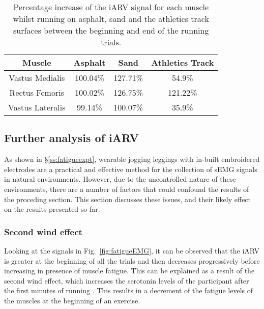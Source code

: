 \documentclass[letterpaper, 10 pt, conference]{ieeeconf}
\newcommand{\fref}[1]{Fig.~\ref{#1}}       \newcommand{\sref}[1]{\S\ref{#1}}          \newcommand{\tref}[1]{\tablename~\ref{#1}} \newcommand{\eref}[1]{(\ref{#1})}
\begin{document}
\begin{table}[t!]
\centering
\label{my-label}
\begin{tabular}{cccc}
\hline
Muscle           & Asphalt  & Sand     & Athletics Track \\\hline
Vastus Medialis  & 100.04\% & 127.71\% & 54.9\%          \\
Rectus Femoris   & 100.02\% & 126.75\% & 121.22\%        \\
Vastus Lateralis & 99.14\%  & 100.07\% & 35.9\%         
\end{tabular}
\caption{Percentage increase of the iARV signal for each muscle whilst running on asphalt, sand and the athletics track surfaces between the beginning and end of the running trials.}
\end{table}

\subsection{Further analysis of iARV}
As shown in \sref{ss:fatigueexpt}, wearable jogging leggings with in-built embroidered
electrodes are a practical and effective method for the collection of sEMG
signals in natural environments. However, due to the uncontrolled nature of these
environments, there are a number of factors that could confound the results of
the proceding section. This section discusses these issues, and their likely effect
on the results presented so far.

\subsubsection{Second wind effect}
Looking at the signals in \fref{fig:fatigueEMG}, it can be observed that
the iARV is greater at the beginning of all the trials and then decreases
progressively before increasing in presence of muscle fatigue. This can be
explained as a result of the second wind effect, which increases the serotonin
levels of the participant after the first minutes of running
\cite{gondola1982psychological}. This results in a decrement of the fatigue
levels of the muscles at the beginning of an exercise.
\end{document}
